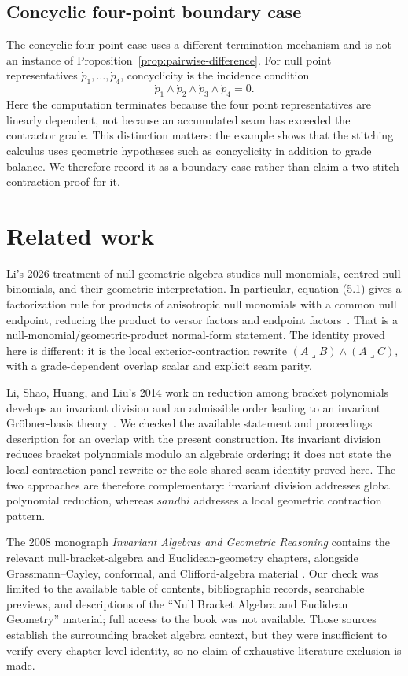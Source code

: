 \documentclass[11pt]{article}
\newcommand{\sandhi}{\textit{sandhi}}
\begin{document}
\subsection{Concyclic four-point boundary case}

The concyclic four-point case uses a different termination mechanism and is
not an instance of Proposition~\ref{prop:pairwise-difference}. For null point
representatives \(\dot p_1,\ldots,\dot p_4\), concyclicity is the incidence
condition
\[
\dot p_1\wedge\dot p_2\wedge\dot p_3\wedge\dot p_4=0.
\]
Here the computation terminates because the four point representatives are
linearly dependent, not because an accumulated seam has exceeded the
contractor grade. This distinction matters: the example shows that the
stitching calculus uses geometric hypotheses such as concyclicity in addition
to grade balance. We therefore record it as a boundary case rather than claim
a two-stitch contraction proof for it.

\section{Related work}

Li's 2026 treatment of null geometric algebra studies null monomials,
centred null binomials, and their geometric interpretation. In particular,
equation (5.1) gives a factorization rule for products of anisotropic null
monomials with a common null endpoint, reducing the product to versor factors
and endpoint factors~\cite{li2026}. That is a null-monomial/geometric-product
normal-form statement. The identity proved here is different: it is the
local exterior-contraction rewrite
\((A\mathbin{\lrcorner}B)\wedge(A\mathbin{\lrcorner}C)\), with a
grade-dependent overlap scalar and explicit seam parity.

Li, Shao, Huang, and Liu's 2014 work on reduction among bracket polynomials
develops an invariant division and an admissible order leading to an
invariant Gröbner-basis theory~\cite{lishao2014}. We checked the available
statement and proceedings description for an overlap with the present
construction. Its invariant division reduces bracket polynomials modulo an
algebraic ordering; it does not state the local contraction-panel rewrite or
the sole-shared-seam identity proved here. The two approaches are therefore
complementary: invariant division addresses global polynomial reduction,
whereas \(\sandhi\) addresses a local geometric contraction pattern.

The 2008 monograph \emph{Invariant Algebras and Geometric Reasoning} contains
the relevant null-bracket-algebra and Euclidean-geometry chapters, alongside
Grassmann--Cayley, conformal, and Clifford-algebra material
\cite{li2008}. Our check was limited to the available table of contents,
bibliographic records, searchable previews, and descriptions of the
``Null Bracket Algebra and Euclidean Geometry'' material; full access to the
book was not available. Those sources establish the surrounding bracket
algebra context, but they were insufficient to verify every chapter-level
identity, so no claim of exhaustive literature exclusion is made.
\end{document}

